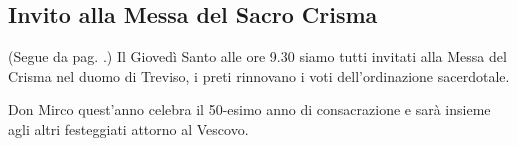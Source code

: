 \clearpage
\subsection{Invito alla Messa del Sacro Crisma}
\label{sacro-crisma}

(Segue da pag. \pageref{celebrazioni}.) Il Giovedì Santo alle ore 9.30 siamo tutti invitati alla Messa del Crisma nel duomo di Treviso, i preti rinnovano i voti dell'ordinazione sacerdotale.

Don Mirco quest'anno celebra il 50-esimo anno di consacrazione e sarà insieme agli altri festeggiati attorno al Vescovo.
